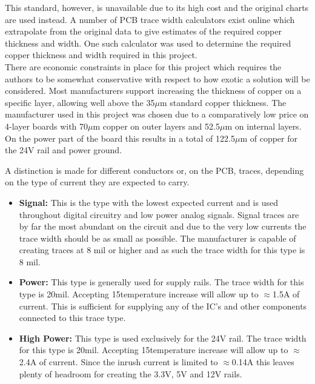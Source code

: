 This standard, however, is unavailable due to its high cost and the original charts are used instead.
A number of PCB trace width calculators exist online which extrapolate from the original data to give estimates of the required copper thickness and width.
One such calculator \cite{pcb_trace_calc} was used to determine the required copper thickness and width required in this project.
~\\
There are economic constraints in place for this project which requires the authors to be somewhat conservative with respect to how exotic a solution will be considered.
Most manufacturers support increasing the thickness of copper on a specific layer, allowing well above the 35$\mu$m standard copper thickness.
The manufacturer used in this project was chosen due to a comparatively low price on 4-layer boards with 70$\mu$m copper on outer layers and 52.5$\mu$m on internal layers.
On the power part of the board this results in a total of 122.5$\mu$m of copper for the 24V rail and power ground.

A distinction is made for different conductors or, on the PCB, traces, depending on the type of current they are expected to carry.
\begin{itemize}
	\item \textbf{Signal:} This is the type with the lowest expected current and is used throughout digital circuitry and low power analog signals.
	Signal traces are by far the most abundant on the circuit and due to the very low currents the trace width should be as small as possible.
	The manufacturer is capable of creating traces at 8 mil or higher and as such the trace width for this type is 8 mil.
	\item \textbf{Power:} This type is generally used for supply rails.
	The trace width for this type is 20mil. Accepting 15\degree temperature increase will allow up to $\approx$1.5A of current.
	This is sufficient for supplying any of the IC's and other components connected to this trace type.
	\item \textbf{High Power:} This type is used exclusively for the 24V rail.
	The trace width for this type is 20mil. Accepting 15\degree temperature increase will allow up to $\approx$2.4A of current.
	Since the inrush current is limited to $\approx$0.14A this leaves plenty of headroom for creating the 3.3V, 5V and 12V rails.
\end{itemize}




